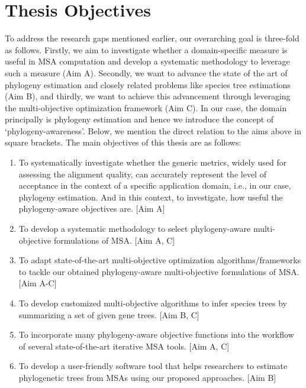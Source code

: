 \section{Thesis Objectives}

To address the research gaps mentioned earlier, our overarching goal is three-fold as follows. Firstly, we aim to investigate whether a domain-specific measure is useful in MSA computation and develop a systematic methodology to leverage such a measure (Aim A). Secondly, we want to advance the state of the art of phylogeny estimation and closely related problems like species tree estimations (Aim B), and thirdly, we want to achieve this advancement through leveraging the multi-objective optimization framework (Aim C). In our case, the domain principally is phylogeny estimation and hence we introduce the concept of ‘phylogeny-awareness’. Below, we mention the direct relation to the aims above in square brackets. The main objectives of this thesis are as follows:

\begin{enumerate}
\item To systematically investigate whether the generic metrics, widely used for assessing the alignment quality, can accurately represent the level of acceptance in the context of a specific application domain, i.e., in our case, phylogeny estimation. And in this context, to investigate, how useful the phylogeny-aware objectives are. [Aim A]

\item To develop a systematic methodology to select phylogeny-aware multi-objective formulations of MSA. [Aim A, C]

\item To adapt state-of-the-art multi-objective optimization algorithms/frameworks to tackle our obtained phylogeny-aware multi-objective formulations of MSA. [Aim A-C]

\item To develop customized multi-objective algorithms to infer species trees by summarizing a set of given gene trees. [Aim B, C]

\item To incorporate many phylogeny-aware objective functions into the workflow of several state-of-the-art iterative MSA tools. [Aim A, C]

\item To develop a user-friendly software tool that helps researchers to estimate phylogenetic trees from MSAs using our proposed approaches. [Aim B]
\end{enumerate}


